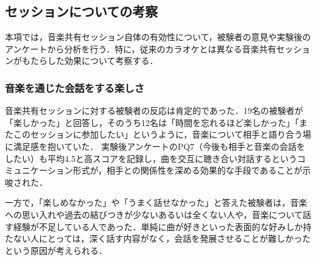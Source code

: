 \subsection{セッションについての考察}

本項では，音楽共有セッション自体の有効性について，被験者の意見や実験後のアンケートから分析を行う．特に，従来のカラオケとは異なる音楽共有セッションがもたらした効果について考察する．

\subsubsection{音楽を通じた会話をする楽しさ}
音楽共有セッションに対する被験者の反応は肯定的であった．19名の被験者が「楽しかった」と回答し，そのうち12名は「時間を忘れるほど楽しかった」「またこのセッションに参加したい」というように，音楽について相手と語り合う場に満足感を抱いていた．
実験後アンケートのPQ7（今後も相手と音楽の会話をしたい）も平均4.5と高スコアを記録し，曲を交互に聴き合い対話するというコミュニケーション形式が，相手との関係性を深める効果的な手段であることが示唆された．

一方で，「楽しめなかった」や「うまく話せなかった」と答えた被験者は，音楽への思い入れや過去の結びつきが少ないあるいは全くない人や，音楽について話す経験が不足している人であった．単純に曲が好きといった表面的な好みしか持たない人にとっては，深く話す内容がなく，会話を発展させることが難しかったという原因が考えられる．


